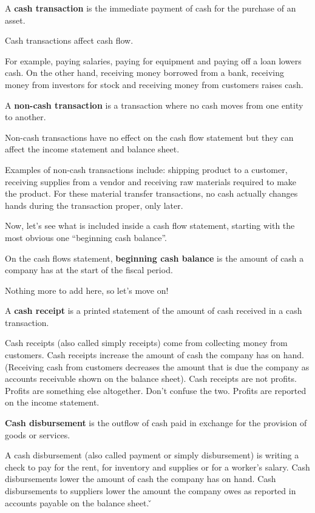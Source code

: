 A \textbf{cash transaction} is the immediate payment of cash for the purchase of an asset.
\ed

Cash transactions affect cash flow.

\be
For example, paying salaries, paying for equipment and paying off a loan lowers cash. On the other hand, receiving
money borrowed from a bank, receiving money from investors for stock and receiving money from customers raises cash.
\ee

A \textbf{non-cash transaction} is a transaction where no cash moves from one entity to another.
\ed

Non-cash transactions have no effect on the cash flow statement but they can affect the income statement and balance
sheet.

\be
Examples of non-cash transactions include: shipping product to a customer, receiving supplies from a vendor and
receiving raw materials required to make the product. For these material transfer transactions, no cash actually
changes hands during the transaction proper, only later.
\ee

Now, let's see what is included inside a cash flow statement, starting with the most obvious one ``beginning cash
balance''.

On the cash flows statement, \textbf{beginning cash balance} is the amount of cash a company has at the start of the
fiscal period.
\ed

Nothing more to add here, so let's move on!

A \textbf{cash receipt} is a printed statement of the amount of cash received in a cash transaction.
\ed

Cash receipts (also called simply receipts) come from collecting money from customers. Cash receipts increase the
amount of cash the company has on hand. (Receiving cash from customers decreases the amount that is due the
company as accounts receivable shown on the balance sheet). Cash receipts are not profits. Profits are something
else altogether. Don't confuse the two. Profits are reported on the income statement.

\textbf{Cash disbursement} is the outflow of cash paid in exchange for the provision of goods or services.
\ed

A cash disbursement (also called payment or simply disbursement) is writing a check to pay for the rent, for
inventory and supplies or for a worker's salary. Cash disbursements lower the amount of cash the company has on hand.
Cash disbursements to suppliers lower the amount the company owes as reported in accounts payable on the
balance sheet. \v 

